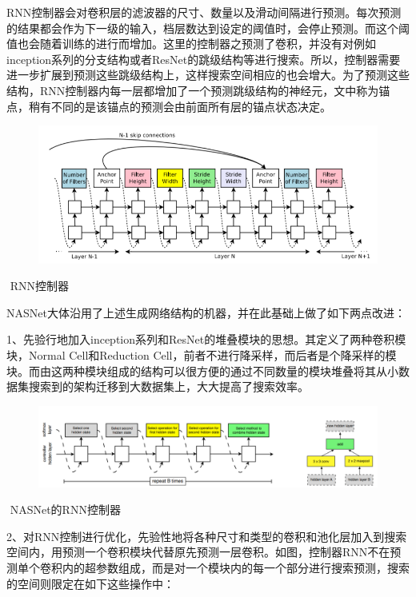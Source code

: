 RNN控制器会对卷积层的滤波器的尺寸、数量以及滑动间隔进行预测。每次预测的结果都会作为下一级的输入，档层数达到设定的阈值时，会停止预测。而这个阈值也会随着训练的进行而增加。这里的控制器之预测了卷积，并没有对例如inception系列的分支结构或者ResNet的跳级结构等进行搜索。所以，控制器需要进一步扩展到预测这些跳级结构上，这样搜索空间相应的也会增大。为了预测这些结构，RNN控制器内每一层都增加了一个预测跳级结构的神经元，文中称为锚点，稍有不同的是该锚点的预测会由前面所有层的锚点状态决定。

\begin{figure}
\centering
\includegraphics{./img/ch14/RNN控制器.png}
\caption{}
\end{figure}

​ RNN控制器

NASNet大体沿用了上述生成网络结构的机器，并在此基础上做了如下两点改进：

1、先验行地加入inception系列和ResNet的堆叠模块的思想。其定义了两种卷积模块，Normal
Cell和Reduction
Cell，前者不进行降采样，而后者是个降采样的模块。而由这两种模块组成的结构可以很方便的通过不同数量的模块堆叠将其从小数据集搜索到的架构迁移到大数据集上，大大提高了搜索效率。

\begin{figure}
\centering
\includegraphics{./img/ch14/NASNet的RNN控制器.png}
\caption{}
\end{figure}

​ NASNet的RNN控制器

2、对RNN控制进行优化，先验性地将各种尺寸和类型的卷积和池化层加入到搜索空间内，用预测一个卷积模块代替原先预测一层卷积。如图，控制器RNN不在预测单个卷积内的超参数组成，而是对一个模块内的每一个部分进行搜索预测，搜索的空间则限定在如下这些操作中：

